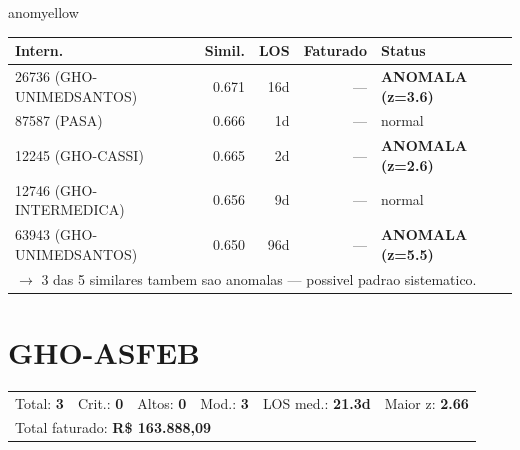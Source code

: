 \documentclass[a4paper,10pt]{article}
\begin{document}
\begin{anomalycard}[Internacao 3735 | GHO-AMIL | MODERADO (z=2.32)]{anomyellow}
\begin{tabular}{l r r r l}\toprule\textbf{Intern.} & \textbf{Simil.} & \textbf{LOS} & \textbf{Faturado} & \textbf{Status} \\\midrule
26736 (GHO-UNIMEDSANTOS) & 0.671 & 16d & --- & \textcolor{anomred}{\textbf{ANOMALA (z=3.6)}} \\
87587 (PASA) & 0.666 & 1d & --- & \textcolor{jcubeblue}{normal} \\
12245 (GHO-CASSI) & 0.665 & 2d & --- & \textcolor{anomred}{\textbf{ANOMALA (z=2.6)}} \\
12746 (GHO-INTERMEDICA) & 0.656 & 9d & --- & \textcolor{jcubeblue}{normal} \\
63943 (GHO-UNIMEDSANTOS) & 0.650 & 96d & --- & \textcolor{anomred}{\textbf{ANOMALA (z=5.5)}} \\
\multicolumn{5}{l}{\textcolor{anomred}{\small $\rightarrow$ 3 das 5 similares tambem sao anomalas --- possivel padrao sistematico.}} \\
\bottomrule\end{tabular}


\end{anomalycard}

\newpage

\clearpage
\section{GHO-ASFEB}
\begin{tcolorbox}[colback=lightblue,colframe=jcubeblue,title={\textbf{Resumo --- GHO-ASFEB}}]
\begin{tabular}{ll@{\quad}ll@{\quad}ll}
Total: \textbf{3} &
Crit.: \textcolor{anomred}{\textbf{0}} &
Altos: \textcolor{anomorange}{\textbf{0}} &
Mod.: \textcolor{anomyellow}{\textbf{3}} &
LOS med.: \textbf{21.3d} &
Maior z: \textbf{2.66} \\

\multicolumn{6}{l}{Total faturado: \textbf{R\$ 163.888,09}} \\

\end{tabular}
\end{tcolorbox}
\end{document}
